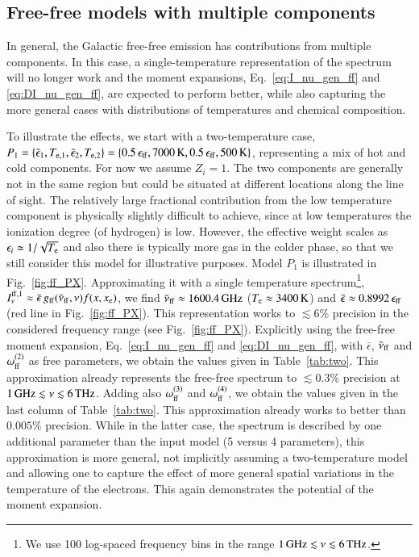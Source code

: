 \documentclass[usenatbib]{mn2e}
\begin{document}
\subsection{Free-free models with multiple components}
\label{sec:model_ff_example}
In general, the Galactic free-free emission has contributions from multiple components. In this case, a single-temperature representation of the spectrum will no longer work and the moment expansions, Eq.~\eqref{eq:I_nu_gen_ff} and \eqref{eq:DI_nu_gen_ff}, are expected to perform better, while also capturing the more general cases with distributions of temperatures and chemical composition. 

To illustrate the effects, we start with a two-temperature case, $P_1=\{\bar\epsilon_1, T_{\rm e, 1}, \bar\epsilon_2, T_{\rm e, 2}\}=\{0.5\,\epsilon_{\rm ff}, 7000\,{\rm K}, 0.5\,\epsilon_{\rm ff}, 500\,{\rm K}\}$, representing a mix of hot and cold components. For now we assume $Z_i=1$. The two components are generally not in the same region but could be situated at different locations along the line of sight. The relatively large fractional contribution from the low temperature component is physically slightly difficult to achieve, since at low temperatures the ionization degree (of hydrogen) is low. However, the effective weight scales as $\epsilon_i \simeq 1/\sqrt{T_{\rm e}}$ and also there is typically more gas in the colder phase, so that we still consider this model for illustrative purposes.
%
Model $P_1$ is illustrated in Fig.~\ref{fig:ff_PX}. Approximating it with a single temperature spectrum\footnote{We use 100 log-spaced frequency bins in the range $1\,{\rm GHz}\lesssim \nu\lesssim 6\,{\rm THz}$.}, $I^{\rm ff, 1}_\nu \approx \bar{\epsilon} \, g_{\rm ff}(\bar{\nu}_{\rm ff}, \nu) f(x, x_{\rm e})$, we find $\bar{\nu}_{\rm ff}\approx 1600.4\,{\rm GHz}$ ($T_{\rm e}\approx 3400\,{\rm K}$) and $\bar\epsilon\approx0.8992\,\epsilon_{\rm ff}$ (red line in Fig.~\ref{fig:ff_PX}). This representation works to $\lesssim 6\%$ precision in the considered frequency range (see Fig.~\ref{fig:ff_PX}). 
%
Explicitly using the free-free moment expansion, Eq.~\eqref{eq:I_nu_gen_ff} and \eqref{eq:DI_nu_gen_ff}, with $\bar{\epsilon}$, $\bar{\nu}_{\rm ff}$ and $\omega_{\rm ff}^{(2)}$ as free parameters, we obtain the values given in Table~\ref{tab:two}. This approximation already represents the free-free spectrum to $\lesssim 0.3\%$ precision at $1\,{\rm GHz}\lesssim \nu\lesssim 6\,{\rm THz}$. Adding also $\omega_{\rm ff}^{(3)}$ and $\omega_{\rm ff}^{(4)}$, we obtain the values given in the last column of Table~\ref{tab:two}. This approximation already works to better than $0.005\%$ precision. While in the latter case, the spectrum is described by one additional parameter than the input model (5 versus 4 parameters), this approximation is more general, not implicitly assuming a two-temperature model and allowing one to capture the effect of more general spatial variations in the temperature of the electrons. This again demonstrates the potential of the moment expansion.
\end{document}
